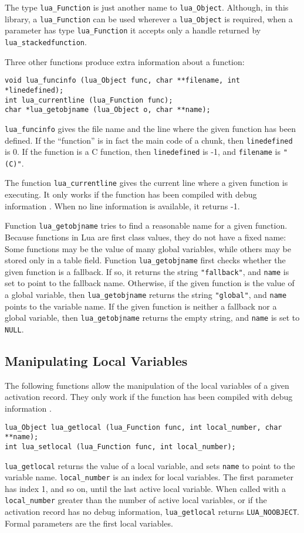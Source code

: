 The type \verb'lua_Function' is just another name
to \verb'lua_Object'.
Although, in this library,
a \verb'lua_Function' can be used wherever a \verb'lua_Object' is required,
when a parameter has type \verb'lua_Function'
it accepts only a handle returned by
\verb'lua_stackedfunction'.

Three other functions produce extra information about a function:
\begin{verbatim}
void lua_funcinfo (lua_Object func, char **filename, int *linedefined);
int lua_currentline (lua_Function func);
char *lua_getobjname (lua_Object o, char **name);
\end{verbatim}
\verb'lua_funcinfo' gives the file name and the line where the
given function has been defined.
If the ``function'' is in fact the main code of a chunk,
then \verb'linedefined' is 0.
If the function is a C function,
then \verb'linedefined' is -1, and \verb'filename' is \verb'"(C)"'.

The function \verb'lua_currentline' gives the current line where
a given function is executing.
It only works if the function has been compiled with debug
information .
When no line information is available, it returns -1.

Function \verb'lua_getobjname' tries to find a reasonable name for
a given function.
Because functions in Lua are first class values,
they do not have a fixed name:
Some functions may be the value of many global variables,
while others may be stored only in a table field.
Function \verb'lua_getobjname' first checks whether the given
function is a fallback.
If so, it returns the string \verb'"fallback"',
and \verb'name' is set to point to the fallback name.
Otherwise, if the given function is the value of a global variable,
then \verb'lua_getobjname' returns the string \verb'"global"',
and \verb'name' points to the variable name.
If the given function is neither a fallback nor a global variable,
then \verb'lua_getobjname' returns the empty string,
and \verb'name' is set to \verb'NULL'.

\subsection{Manipulating Local Variables}

The following functions allow the manipulation of the
local variables of a given activation record.
They only work if the function has been compiled with debug
information .
\begin{verbatim}
lua_Object lua_getlocal (lua_Function func, int local_number, char **name);
int lua_setlocal (lua_Function func, int local_number);
\end{verbatim}
\verb|lua_getlocal| returns the value of a local variable,
and sets \verb'name' to point to the variable name.
\verb'local_number' is an index for local variables.
The first parameter has index 1, and so on, until the
last active local variable.
When called with a \verb'local_number' greater than the
number of active local variables,
or if the activation record has no debug information,
\verb'lua_getlocal' returns \verb'LUA_NOOBJECT'.
Formal parameters are the first local variables.

